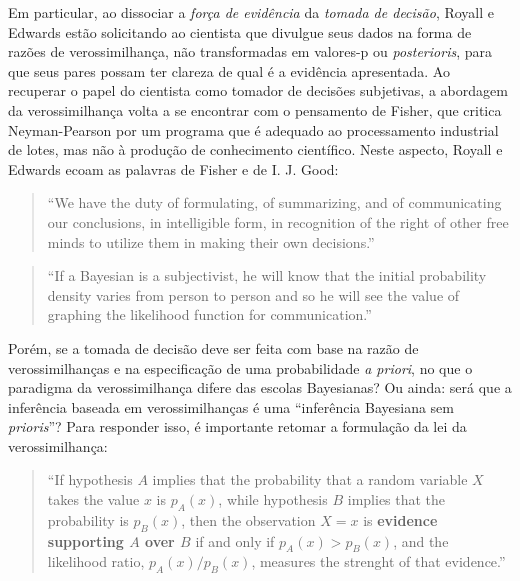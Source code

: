 Em particular, 
ao dissociar a {\em força de evidência} da {\em tomada de decisão}, Royall e Edwards estão solicitando ao cientista
que divulgue seus dados na forma de razões de verossimilhança, não transformadas em valores-p ou {\em posterioris}, para que
seus pares possam ter clareza de qual é a evidência apresentada. 
Ao recuperar o papel do cientista como tomador de decisões subjetivas, a abordagem da verossimilhança volta a se encontrar
com o pensamento de Fisher, que critica Neyman-Pearson por um programa que é adequado ao processamento industrial de lotes,
mas não à produção de conhecimento científico. Neste aspecto, Royall e Edwards ecoam as palavras de Fisher e de I. J. Good:

\begin{quote}
``We have the duty of formulating, of summarizing, and of communicating our conclusions, in intelligible form, in
recognition of the right of other free minds to utilize them in making their own decisions.'' \citep{Fisher1955}
\end{quote}

\begin{quote}
``If a Bayesian is a subjectivist, he will know that the initial probability density varies from person to person and
so he will see the value of graphing the likelihood function for communication.'' \citep{Good76}
\end{quote}

Porém, se a tomada de decisão deve ser feita com base na razão de verossimilhanças e na especificação de uma 
probabilidade {\em a priori}, no que o paradigma da verossimilhança difere das escolas Bayesianas? Ou ainda: será que a 
inferência baseada em verossimilhanças é uma ``inferência Bayesiana sem {\em prioris}''? Para responder isso,
é importante retomar a formulação da lei da verossimilhança:

\begin{quote}
``If hypothesis $A$ implies that the probability that a random variable $X$ takes the value $x$ is $p_A(x)$, while
hypothesis $B$ implies that the probability is $p_B(x)$, then the observation $X=x$ is \textbf{evidence supporting $A$ over $B$}
if and only if $p_A(x) > p_B(x)$, and the likelihood ratio, $p_A(x)/p_B(x)$, measures the strenght of that evidence.''
\citep{Hacking65}
\end{quote}

